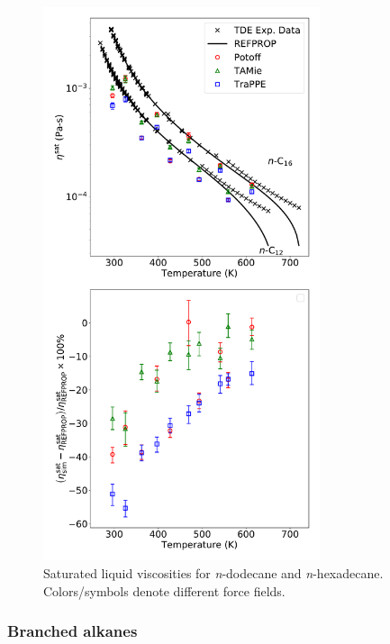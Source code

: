 \documentclass[preprint,review,12pt]{elsarticle}
\begin{document}
	\begin{figure}[htb!]
		\centering
		\includegraphics[width=3.2in]{compare_force_fields_C12_C16.pdf}
		\caption{Saturated liquid viscosities for \textit{n}-dodecane and \textit{n}-hexadecane. Colors/symbols denote different force fields.}
		\label{fig:Saturation_C12_C16}
	\end{figure} 
	
	\subsubsection{Branched alkanes}
	
	
	
\end{document}
